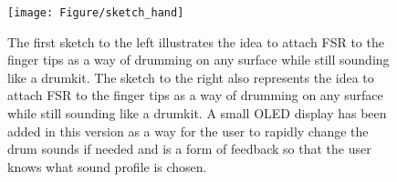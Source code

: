 \begin{figure}[H]
\centering
\texttt{[image: Figure/sketch\_hand]}
\caption{The first sketch to the left illustrates the idea to attach FSR to the finger tips as a way of drumming on any surface while still sounding like a drumkit. The sketch to the right also represents the idea to attach FSR to the finger tips as a way of drumming on any surface while still sounding like a drumkit. A small OLED display has been added in this version as a way for the user to rapidly change the drum sounds if needed and is a form of feedback so that the user knows what sound profile is chosen.}
\label{fig:sketch_hand}
\end{figure}